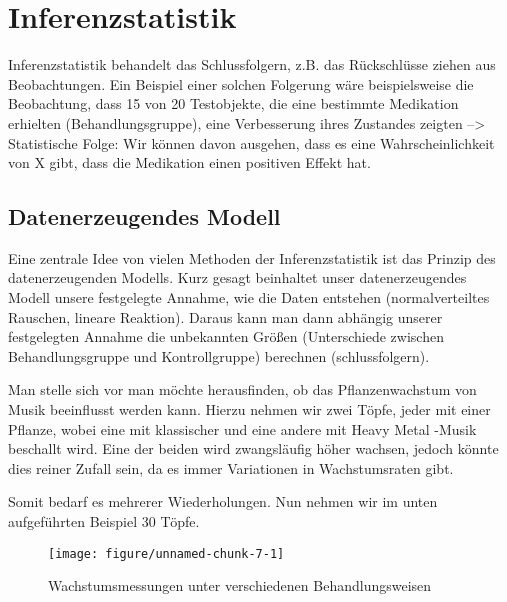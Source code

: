 \documentclass[a4paper,twoside]{tufte-book}\usepackage[]{graphicx}\usepackage[]{color}
\makeatletter
\def\maxwidth{ %
	\ifdim\Gin@nat@width>\linewidth
	\linewidth
	\else
	\Gin@nat@width
	\fi
}
\makeatother
\begin{document}
\chapter{Inferenzstatistik}


Inferenzstatistik behandelt das Schlussfolgern, z.B. das Rückschlüsse ziehen aus Beobachtungen. Ein Beispiel einer solchen Folgerung wäre beispielsweise die Beobachtung, dass 15 von 20 Testobjekte, die eine bestimmte Medikation erhielten (Behandlungsgruppe), eine Verbesserung ihres Zustandes zeigten --> Statistische Folge: Wir können davon ausgehen, dass es eine Wahrscheinlichkeit von X gibt, dass die Medikation einen positiven Effekt hat.


\section{Datenerzeugendes Modell}


Eine zentrale Idee von vielen Methoden der Inferenzstatistik ist das Prinzip des datenerzeugenden Modells. Kurz gesagt beinhaltet unser datenerzeugendes Modell unsere festgelegte Annahme, wie die Daten entstehen (normalverteiltes Rauschen, lineare Reaktion). Daraus kann man dann abhängig unserer festgelegten Annahme die unbekannten Größen (Unterschiede zwischen Behandlungsgruppe und Kontrollgruppe) berechnen (schlussfolgern).


Man stelle sich vor man möchte herausfinden, ob das Pflanzenwachstum von Musik beeinflusst werden kann. Hierzu nehmen wir zwei Töpfe, jeder mit einer Pflanze, wobei eine mit klassischer und eine andere mit Heavy Metal -Musik beschallt wird. Eine der beiden wird zwangsläufig höher wachsen, jedoch könnte dies reiner Zufall sein, da es immer Variationen in Wachstumsraten gibt.

Somit bedarf es mehrerer Wiederholungen. Nun nehmen wir im unten aufgeführten Beispiel 30 Töpfe.

\begin{figure}[htbp]
\begin{center}
\begin{Schunk}

\texttt{[image: figure/unnamed-chunk-7-1]} \end{Schunk}
\caption{Wachstumsmessungen unter verschiedenen Behandlungsweisen}
\label{fig: plant growth music}
\end{center}
\end{figure}
\end{document}
